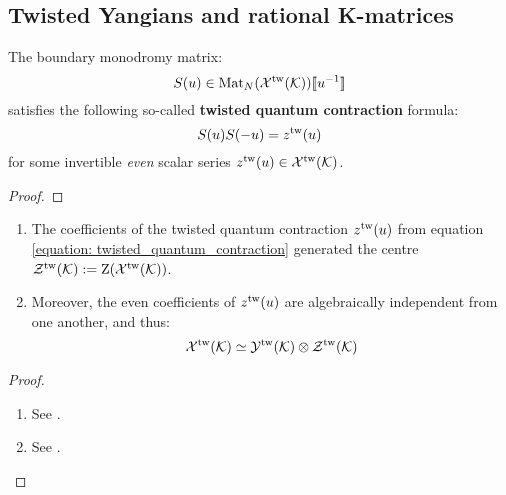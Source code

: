    \subsection{Twisted Yangians and rational K-matrices}
        \begin{definition} \label{def: (extended)_twisted_yangians}
            
        \end{definition}
    
        \begin{lemma} \label{lemma: twisted_quantum_contractions}
            The boundary monodromy matrix:
                $$S(u) \in \operatorname{Mat}_N( \mathcal{X}^{\mathrm{tw}}(\mathcal{K}) )[\![u^{-1}]\!]$$
            satisfies the following so-called \textbf{twisted quantum contraction} formula:
                \begin{equation} \label{equation: twisted_quantum_contraction}
                    S(u) S(-u) = z^{\mathrm{tw}}(u)
                \end{equation}
            for some invertible \textit{even} scalar series $z^{\mathrm{tw}}(u) \in \mathcal{X}^{\mathrm{tw}}(\mathcal{K})$.
        \end{lemma}
            \begin{proof}
                
            \end{proof}
        \begin{lemma} \label{lemma: centres_of_extended_twisted_yangians}
            \begin{enumerate}
                \item The coefficients of the twisted quantum contraction $z^{\mathrm{tw}}(u)$ from equation \eqref{equation: twisted_quantum_contraction} generated the centre $\mathcal{Z}^{\mathrm{tw}}(\mathcal{K}) := \mathrm{Z}( \mathcal{X}^{\mathrm{tw}}(\mathcal{K}) )$.
                \item Moreover, the even coefficients of $z^{\mathrm{tw}}(u)$ are algebraically independent from one another, and thus:
                    $$\calX^{\tw}(\calK) \cong \calY^{\tw}(\calK) \tensor \calZ^{\tw}(\calK)$$
            \end{enumerate}
        \end{lemma}
            \begin{proof}
                \begin{enumerate}
                    \item See \cite[Corollary 3.5]{guay_regelskis_twisted_yangians_for_symmetric_pairs_of_types_BCD}.
                    \item See \cite[Corollary 3.6]{guay_regelskis_twisted_yangians_for_symmetric_pairs_of_types_BCD}.
                \end{enumerate}
            \end{proof}